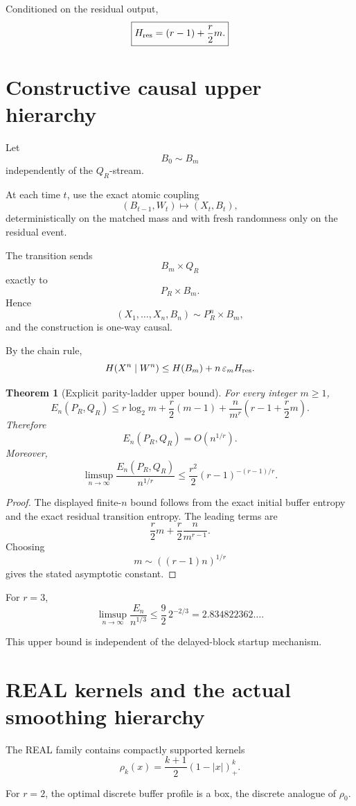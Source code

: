 \documentclass[11pt,a4paper]{article}
\newtheorem{theorem}{Theorem}[section]
\newcommand{\eps}{\varepsilon}
\begin{document}
Conditioned on the residual output,
\[
\boxed{
H_{\rm res}
=
(r-1)+\frac r2m.
}
\]

\section{Constructive causal upper hierarchy}

Let
\[
B_0\sim B_m
\]
independently of the \(Q_R\)-stream.

At each time \(t\), use the exact atomic coupling
\[
(B_{t-1},W_t)
\longmapsto
(X_t,B_t),
\]
deterministically on the matched mass and with fresh randomness only on the
residual event.

The transition sends
\[
B_m\times Q_R
\]
exactly to
\[
P_R\times B_m.
\]
Hence
\[
(X_1,\ldots,X_n,B_n)
\sim
P_R^n\times B_m,
\]
and the construction is one-way causal.

By the chain rule,
\[
H(X^n\mid W^n)
\le
H(B_m)+n\,\eps_m H_{\rm res}.
\]

\begin{theorem}[Explicit parity-ladder upper bound]
For every integer \(m\ge1\),
\[
\boxed{
E_n(P_R,Q_R)
\le
r\log_2m
+
\frac r2(m-1)
+
\frac n{m^r}
\left(
r-1+\frac r2m
\right).
}
\]
Therefore
\[
\boxed{
E_n(P_R,Q_R)=O(n^{1/r}).
}
\]
Moreover,
\[
\boxed{
\limsup_{n\to\infty}
\frac{E_n(P_R,Q_R)}{n^{1/r}}
\le
\frac{r^2}{2}(r-1)^{-(r-1)/r}.
}
\]
\end{theorem}

\begin{proof}
The displayed finite-\(n\) bound follows from the exact initial buffer
entropy and the exact residual transition entropy.  The leading terms are
\[
\frac r2m+\frac r2\frac{n}{m^{r-1}}.
\]
Choosing
\[
m\sim((r-1)n)^{1/r}
\]
gives the stated asymptotic constant.
\end{proof}

For \(r=3\),
\[
\boxed{
\limsup_{n\to\infty}
\frac{E_n}{n^{1/3}}
\le
\frac92\,2^{-2/3}
=
2.834822362\ldots.
}
\]

This upper bound is independent of the delayed-block startup mechanism.

\section{REAL kernels and the actual smoothing hierarchy}

The REAL family contains compactly supported kernels
\[
\rho_k(x)
=
\frac{k+1}{2}(1-|x|)^k_+.
\]

For \(r=2\), the optimal discrete buffer profile is a box, the discrete
analogue of \(\rho_0\).
\end{document}
